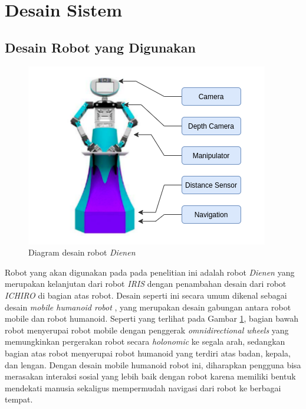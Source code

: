 \section{Desain Sistem}
\label{sec:desainsistem}

\subsection{Desain Robot yang Digunakan}

\begin{figure} [ht]
  \centering
  \includegraphics[scale=0.6]{gambar/desainrobot.png}
  \caption{Diagram desain robot \emph{Dienen}}
  \label{fig:desainrobot}
\end{figure}

Robot yang akan digunakan pada pada penelitian ini adalah robot \emph{Dienen} yang merupakan kelanjutan dari robot \emph{IRIS} \citep{dikairono2020}\citep{zanuar2019} dengan penambahan desain dari robot \emph{ICHIRO} \citep{muhtadin2019} di bagian atas robot.
Desain seperti ini secara umum dikenal sebagai desain \emph{mobile humanoid robot} \citep{mohamed2012}, yang merupakan desain gabungan antara robot mobile dan robot humanoid.
Seperti yang terlihat pada Gambar \ref{fig:desainrobot}, bagian bawah robot menyerupai robot mobile dengan penggerak \emph{omnidirectional wheels} yang memungkinkan pergerakan robot secara \emph{holonomic} ke segala arah\citep{oliveira2008}, sedangkan bagian atas robot menyerupai robot humanoid yang terdiri atas badan, kepala, dan lengan.
Dengan desain mobile humanoid robot ini, diharapkan pengguna bisa merasakan interaksi sosial yang lebih baik dengan robot karena memiliki bentuk mendekati manusia \citep{rossi2018} sekaligus mempermudah navigasi dari robot ke berbagai tempat.

